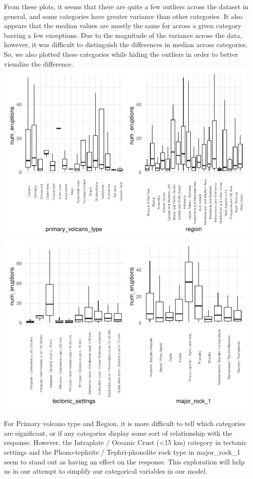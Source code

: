 \documentclass[
  12pt,
]{article}
\begin{document}
From these plots, it seems that there are quite a few outliers across
the dataset in general, and some categories have greater variance than
other categories. It also appears that the median values are mostly the
same for across a given category barring a few exceptions. Due to the
magnitude of the variance across the data, however, it was difficult to
distinguish the differences in median across categories. So, we also
plotted these categories while hiding the outliers in order to better
visualize the difference.
\includegraphics{Report_files/figure-latex/unnamed-chunk-2-1.pdf}
\includegraphics{Report_files/figure-latex/unnamed-chunk-2-2.pdf}

For Primary volcano type and Region, it is more difficult to tell which
categories are significant, or if any categories display some sort of
relationship with the response. However, the Intraplate / Oceanic Crust
(\textless15 km) category in tectonic settings and the Phono-tephrite /
Tephri-phonolite rock type in major\_rock\_1 seem to stand out as having
an effect on the response. This exploration will help us in our attempt
to simplify our categorical variables in our model.
\end{document}
